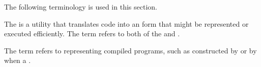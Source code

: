 
%
%   
%
%

\def\sim#1#2#3{{\cal S}\sub{#1}(#2,#3)}



 
The following terminology is used in this section.
 
The  is a utility that translates code into an
 form that might be represented or
executed efficiently.
The term  refers to both of the 
 and .

The term  refers to 
 representing compiled programs, such as  constructed
by  or by  when  a .

